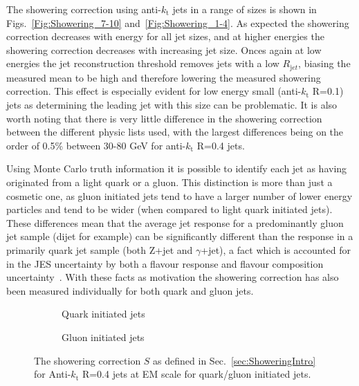 The showering correction using anti-$k_\mathrm{t}$ jets in a range of sizes is shown in Figs.~\ref{Fig:Showering_7-10} and~\ref{Fig:Showering_1-4}.  
As expected the showering correction decreases with energy for all jet sizes, and at higher energies the showering correction decreases with increasing jet size.  
Onces again at low energies the jet reconstruction threshold removes jets with a low $R_{\mathrm jet}$, biasing the measured mean to be high and therefore lowering the measured showering correction.  
This effect is especially evident for low energy small (anti-$k_\mathrm{t}$ R=0.1) jets as determining the leading jet with this size can be problematic.  
It is also worth noting that there is very little difference in the showering correction between the different physic lists used, with the largest differences being on the order of 0.5\% between 30-80 GeV for anti-$k_\mathrm{t}$ R=0.4 jets.  

Using Monte Carlo truth information it is possible to identify each jet as having originated from a light quark or a gluon.  
This distinction is more than just a cosmetic one, as gluon initiated jets tend to have a larger number of lower energy particles and tend to be wider (when compared to light quark initiated jets).   
These differences mean that the average jet response for a predominantly gluon jet sample (dijet for example) can be significantly different than the response in a primarily quark jet sample (both Z+jet and $\gamma$+jet), a fact which is accounted for in the JES uncertainty by both a flavour response and flavour composition uncertainty~\cite{Aaboud:2017jcu}.  
With these facts as motivation the showering correction has also been measured individually for both quark and gluon jets.  

\begin{figure}[!ht]
  \centering
  \begin{subfigure}{.5\textwidth}
    \centering
    \caption{Quark initiated jets}
  \end{subfigure}%
  \begin{subfigure}{.5\textwidth}  \centering
    \caption{Gluon initiated jets}
  \end{subfigure}
  \caption[Showering correction for quark/gluon initiated jets.]
{\small The showering correction $S$ as defined in Sec.~\ref{sec:ShoweringIntro} for Anti-$k_\mathrm{t}$ R=0.4 jets at EM scale for quark/gluon initiated jets.  }
  \label{Fig:Showering_QG4}
\end{figure} 

